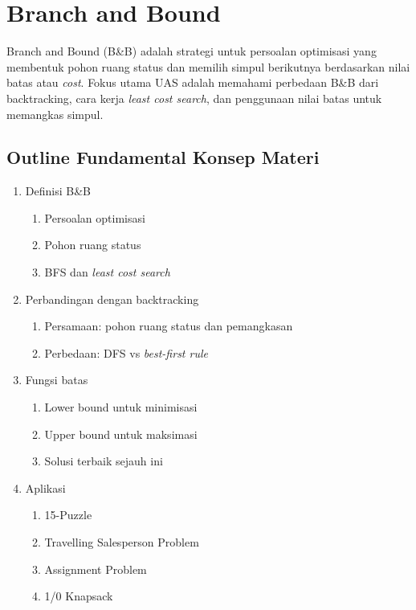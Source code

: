 \section{Branch and Bound}

Branch and Bound (B\&B) adalah strategi untuk persoalan optimisasi yang membentuk pohon ruang status dan memilih simpul berikutnya berdasarkan nilai batas atau \textit{cost}. Fokus utama UAS adalah memahami perbedaan B\&B dari backtracking, cara kerja \textit{least cost search}, dan penggunaan nilai batas untuk memangkas simpul.

\subsection{Outline Fundamental Konsep Materi}
\begin{enumerate}
    \item Definisi B\&B
    \begin{enumerate}
        \item Persoalan optimisasi
        \item Pohon ruang status
        \item BFS dan \textit{least cost search}
    \end{enumerate}
    \item Perbandingan dengan backtracking
    \begin{enumerate}
        \item Persamaan: pohon ruang status dan pemangkasan
        \item Perbedaan: DFS vs \textit{best-first rule}
    \end{enumerate}
    \item Fungsi batas
    \begin{enumerate}
        \item Lower bound untuk minimisasi
        \item Upper bound untuk maksimasi
        \item Solusi terbaik sejauh ini
    \end{enumerate}
    \item Aplikasi
    \begin{enumerate}
        \item 15-Puzzle
        \item Travelling Salesperson Problem
        \item Assignment Problem
        \item 1/0 Knapsack
    \end{enumerate}
\end{enumerate}

